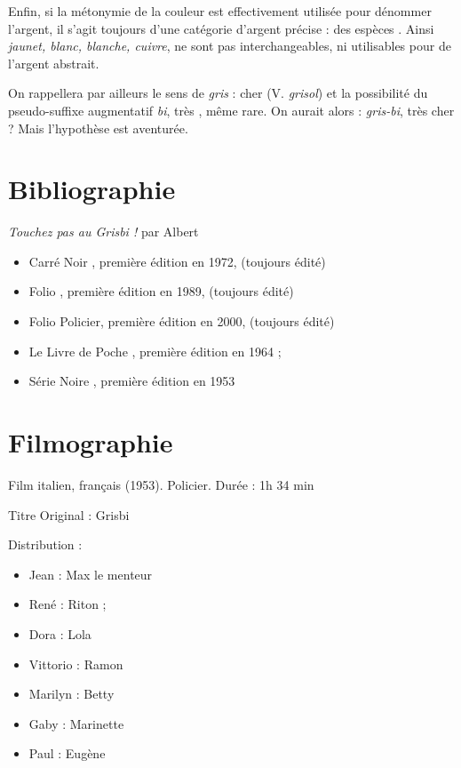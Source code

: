 Enfin, si la métonymie de la couleur est effectivement utilisée pour dénommer
l'argent, il s'agit toujours d'une catégorie d'argent précise : des \og espèces \fg{}.
Ainsi \emph{jaunet, blanc, blanche, cuivre}, ne sont pas interchangeables, ni 
utilisables pour \og de l'argent \fg{} abstrait.

On rappellera par ailleurs le sens de \emph{gris} : \og cher \fg{} (V. \emph{grisol}) et la possibilité du pseudo-suffixe augmentatif \emph{bi}, \og très \fg{}, même rare. On aurait alors : \emph{gris-bi}, \og très cher \fg{} ? Mais l'hypothèse est aventurée.


\section*{Bibliographie}


\emph{Touchez pas au Grisbi !} par Albert 

\begin{itemize}
	\item Carré Noir , première édition en 1972, (toujours édité)
	\item Folio , première édition en 1989, (toujours édité)
	\item Folio Policier, première édition en 2000, (toujours édité)
	\item Le Livre de Poche , première édition en 1964 ;
	\item Série Noire , première édition en 1953
\end{itemize}


\section*{Filmographie}



Film italien, français (1953). Policier. Durée : 1h 34 min

Titre Original : Grisbi

Distribution :

\begin{itemize}
	\item Jean  : Max le menteur	
	\item René  : Riton ;
	\item Dora  : Lola	
	\item Vittorio  : Ramon	
	\item Marilyn  : Betty	
	\item Gaby  : Marinette	
	\item Paul  : Eugène
\end{itemize}

